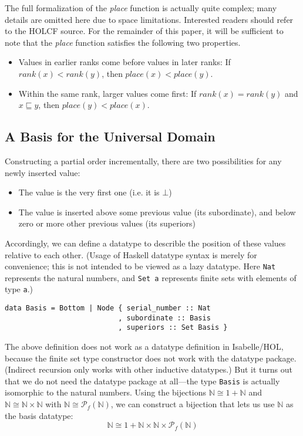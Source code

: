 \documentclass{llncs}
\begin{document}
The full formalization of the \emph{place} function is actually quite
complex; many details are omitted here due to space limitations.
Interested readers should refer to the HOLCF source.  For the
remainder of this paper, it will be sufficient to note that the
\emph{place} function satisfies the following two properties.
\begin{itemize}
\item Values in earlier ranks come before values in later ranks: If
  $\mathit{rank}(x) < \mathit{rank}(y)$, then $\mathit{place}(x) <
  \mathit{place}(y)$.
\item Within the same rank, larger values come first: If
  $\mathit{rank}(x) = \mathit{rank}(y)$ and $x \sqsubseteq y$, then
  $\mathit{place}(y) < \mathit{place}(x)$.
\end{itemize}

\subsection{A Basis for the Universal Domain}

Constructing a partial order incrementally, there are two
possibilities for any newly inserted value:
\begin{itemize}
\item The value is the very first one (i.e. it is $\bot$)
\item The value is inserted above some previous value (its
  subordinate), and below zero or more other previous values (its
  superiors)
\end{itemize}
Accordingly, we can define a datatype to describle the position of
these values relative to each other.  (Usage of Haskell datatype
syntax is merely for convenience; this is not intended to be viewed as
a lazy datatype. Here \texttt{Nat} represents the natural numbers, and
\texttt{Set a} represents finite sets with elements of type
\texttt{a}.)
\begin{verbatim}
data Basis = Bottom | Node { serial_number :: Nat
                           , subordinate :: Basis
                           , superiors :: Set Basis }
\end{verbatim}

The above definition does not work as a datatype definition in
Isabelle/HOL, because the finite set type constructor does not work
with the datatype package.  (Indirect recursion only works with other
inductive datatypes.)  But it turns out that we do not need the
datatype package at all---the type \texttt{Basis} is actually
isomorphic to the natural numbers.  Using the bijections $\mathbb{N}
\cong 1 + \mathbb{N}$ and $\mathbb{N} \cong \mathbb{N} \times
\mathbb{N}$ with $\mathbb{N} \cong \mathcal{P}_f(\mathbb{N})$, we can
construct a bijection that lets us use $\mathbb{N}$ as the basis
datatype:
\begin{equation}
\mathbb{N} \cong
  1 + \mathbb{N} \times \mathbb{N} \times \mathcal{P}_f(\mathbb{N})
\end{equation}
\end{document}
